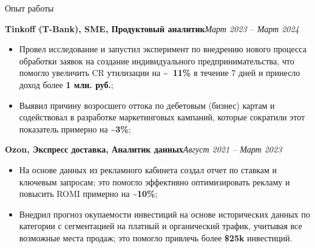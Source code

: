 \documentclass[]{mcdowellcv}
\renewenvironment{cvsubsection}[2]{%
  \begin{adjustwidth}{\subsectionmargin}{\subsectionmargin}%
    {\bfseries #1}\hfill #2\par\vspace{0.5em}%
}{%
  \end{adjustwidth}%
  \vspace*{\aftersubsectionspace}%
}
\begin{document}
\begin{cvsection}{\Large Опыт работы}
        \begin{cvsubsection}{Tinkoff (T-Bank), SME, Продуктовый аналитик}{\textit{Март 2023 -- Март 2024}}
            \begin{itemize}
                \item Провел исследование и запустил эксперимент по внедрению нового процесса обработки заявок на создание индивидуального предпринимательства, что помогло увеличить CR утилизации на \textbf{\textasciitilde ~11\%} в течение 7 дней и принесло доход более \textbf{1 млн. руб.};
                \item Выявил причину возросшего оттока по дебетовым (бизнес) картам и содействовал в разработке маркетинговых кампаний, которые сократили этот показатель примерно на \textbf{\textasciitilde 3\%};
            \end{itemize}
        \end{cvsubsection}
        
        \begin{cvsubsection}{Ozon, Экспресс доставка, Аналитик данных}{\textit{Август 2021 -- Март 2023}}
            \begin{itemize}
                \item На основе данных из рекламного кабинета создал отчет по ставкам и ключевым запросам; это помогло эффективно оптимизировать рекламу и повысить ROMI примерно на \textbf{\textasciitilde 10\%};
                \item Внедрил прогноз окупаемости инвестиций на основе исторических данных по категории с сегментацией на платный и органический трафик, учитывая все возможные места продаж; это помогло привлечь более \textbf{\$25k} инвестиций.
            \end{itemize}
        \end{cvsubsection}
    \end{cvsection}
    
\end{document}
